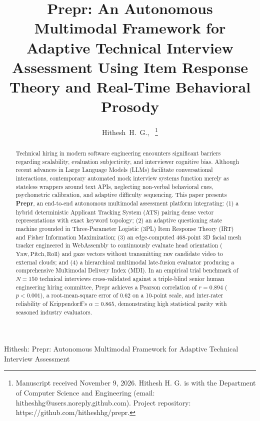 \documentclass[journal,10pt,twocolumn]{IEEEtran}
\begin{document}
\title{Prepr: An Autonomous Multimodal Framework for Adaptive Technical Interview Assessment Using Item Response Theory and Real-Time Behavioral Prosody}

\author{Hithesh~H.~G.,~
\thanks{Manuscript received November 9, 2026. Hithesh H. G. is with the Department of Computer Science and Engineering (email: hitheshhg@users.noreply.github.com). Project repository: https://github.com/hitheshhg/prepr.}
}

%
{Hithesh: Prepr: Autonomous Multimodal Framework for Adaptive Technical Interview Assessment}

\maketitle

\begin{abstract}
Technical hiring in modern software engineering encounters significant barriers regarding scalability, evaluation subjectivity, and interviewer cognitive bias. Although recent advances in Large Language Models (LLMs) facilitate conversational interactions, contemporary automated mock interview systems function merely as stateless wrappers around text APIs, neglecting non-verbal behavioral cues, psychometric calibration, and adaptive difficulty sequencing. This paper presents \textbf{Prepr}, an end-to-end autonomous multimodal assessment platform integrating: (1) a hybrid deterministic Applicant Tracking System (ATS) pairing dense vector representations with exact keyword topology; (2) an adaptive questioning state machine grounded in Three-Parameter Logistic (3PL) Item Response Theory (IRT) and Fisher Information Maximization; (3) an edge-computed 468-point 3D facial mesh tracker engineered in WebAssembly to continuously evaluate head orientation ($\text{Yaw}, \text{Pitch}, \text{Roll}$) and gaze vectors without transmitting raw candidate video to external clouds; and (4) a hierarchical multimodal late-fusion evaluator producing a comprehensive Multimodal Delivery Index (MDI). In an empirical trial benchmark of $N = 150$ technical interviews cross-validated against a triple-blind senior human engineering hiring committee, Prepr achieves a Pearson correlation of $r = 0.894$ ($p < 0.001$), a root-mean-square error of $0.62$ on a 10-point scale, and inter-rater reliability of Krippendorff's $\alpha = 0.865$, demonstrating high statistical parity with seasoned industry evaluators.
\end{abstract}
\end{document}
